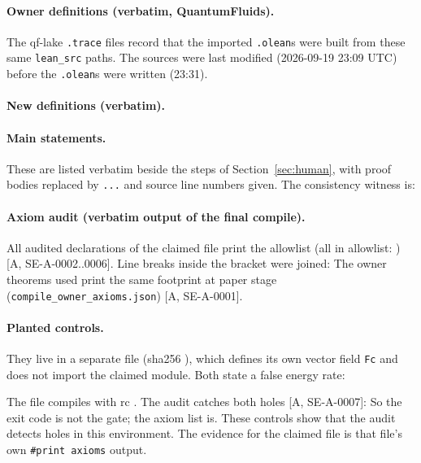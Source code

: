 \documentclass[11pt]{article}
\newcommand{\hash}[1]{{\ttfamily\expandafter\seqsplit\expandafter{#1}}}
\newcommand{\leanst}[1]{}
\theoremstyle{remark}
\newcommand{\tier}[1]{\textsf{[#1]}}
\newcommand{\lean}[1]{\texttt{#1}}
\begin{document}
\paragraph{Owner definitions (verbatim, QuantumFluids).}\leavevmode\par
The qf-lake \texttt{.trace} files record that the imported \texttt{.olean}s were built from these same \texttt{lean\_src}
paths. The sources were last modified (2026-09-19 23:09 UTC) before the \texttt{.olean}s were written (23:31).


\paragraph{New definitions (verbatim).}\leavevmode\par


\paragraph{Main statements.} These are listed verbatim beside the steps of Section~\ref{sec:human}, with proof bodies replaced
by \texttt{...} and source line numbers given. The consistency witness is:
\leanst{zero_trajectory_is_solution}

\paragraph{Axiom audit (verbatim output of the final compile).} All \FlowNaxiom{} audited declarations of the claimed file
print the allowlist (all in allowlist: \FlowAllAllow) \tier{A, SE-A-0002..0006}. Line breaks inside the bracket were joined:
{\scriptsize}
The owner theorems used print the same footprint at paper stage (\texttt{compile\_owner\_axioms.json}) \tier{A, SE-A-0001}.

\paragraph{Planted controls.} They live in a separate file (sha256 \hash{\CtlSha}), which defines its own vector field
\lean{Fc} and does not import the claimed module. Both state a false energy rate:

The file compiles with rc \CtlRc. The audit catches both holes \tier{A, SE-A-0007}:
{\scriptsize}
So the exit code is not the gate; the axiom list is. These controls show that the audit detects holes in this environment.
The evidence for the claimed file is that file's own \lean{\#print axioms} output.
\end{document}
